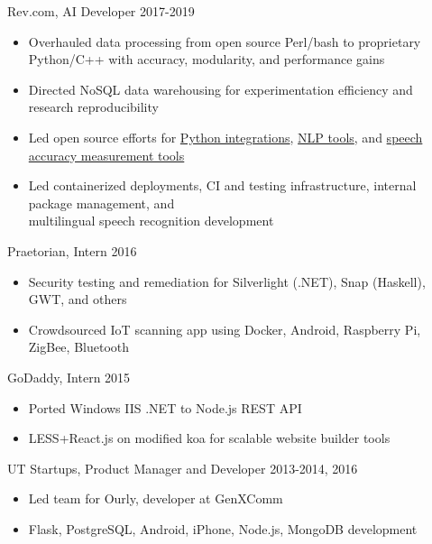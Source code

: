 \documentclass[line,margin]{res}
\begin{document}
\begin{resume}
    Rev.com, AI Developer
    \hfill  2017-2019
        \begin{itemize} \itemsep -2pt
        \item Overhauled data processing from open source Perl/bash to proprietary Python/C++ with accuracy, modularity, and performance gains
        \item Directed NoSQL data warehousing for experimentation efficiency and research reproducibility
        \item Led open source efforts for \href{https://github.com/revdotcom/revai-python-sdk}{Python integrations}, \href{https://github.com/revdotcom/words2num}{NLP tools}, and \href{https://github.com/revdotcom/fstalign}{speech accuracy measurement tools}
        \item Led containerized deployments, CI and testing infrastructure, internal package management, and\\ multilingual speech recognition development
        \end{itemize}

    \vspace{-8pt}
    Praetorian, Intern
    \hfill  2016
        \begin{itemize} \itemsep -2pt
        \item Security testing and remediation for Silverlight (.NET), Snap (Haskell), GWT, and others
        \item Crowdsourced IoT scanning app using 
            Docker, Android, Raspberry Pi, ZigBee, Bluetooth
        \end{itemize}

    \vspace{-8pt}
    GoDaddy, Intern
    \hfill  2015
        \begin{itemize} \itemsep -2pt
        \item Ported Windows IIS .NET to Node.js REST API
        \item LESS+React.js on modified koa for scalable website builder tools
        \end{itemize}

    \vspace{-8pt}
    UT Startups, Product Manager and Developer
    \hfill  2013-2014, 2016
        \begin{itemize} \itemsep -2pt
        \item Led team for Ourly, developer at GenXComm
        \item Flask, PostgreSQL, Android, iPhone, Node.js, MongoDB development
        \end{itemize}


\end{resume}
\end{document}
